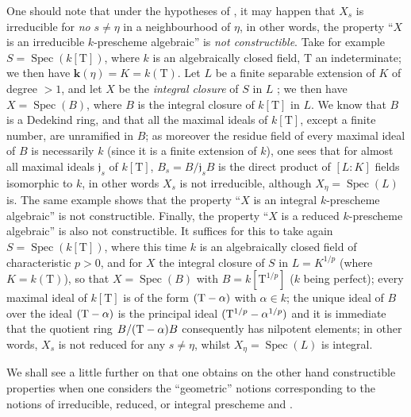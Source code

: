 \begin{remark}[9.5.7]
\label{IV.9.5.7}
One should note that under the hypotheses of , it may happen that $X_s$ is irreducible for \emph{no} $s\neq\eta$ in a neighbourhood of $\eta$, in other words, the property ``$X$ is an irreducible $k$-prescheme algebraic'' is \emph{not constructible}.
Take for example $S=\operatorname{Spec}(k[\mathrm{T}])$, where $k$ is an algebraically closed field, $\mathrm{T}$ an indeterminate; we then have $\boldsymbol{k}(\eta)=K=k(\mathrm{T})$.
Let $L$ be a finite separable extension of $K$ of degree $>1$, and let $X$ be the \emph{integral closure} of $S$ in $L$ ; we then have $X=\operatorname{Spec}(B)$, where $B$ is the integral closure of $k[\mathrm{T}]$ in $L$.
We know that $B$ is a Dedekind ring, and that all the maximal ideals of $k[\mathrm{T}]$, except a finite number, are unramified in $B$; as moreover the residue field of every maximal ideal of $B$ is necessarily $k$ (since it is a finite extension of $k$), one sees that for almost all maximal ideals $\mathfrak{j}_s$ of $k[\mathrm{T}]$, $B_s=B/\mathfrak{j}_s B$ is the direct product of $[L:K]$ fields isomorphic to $k$, in other words $X_s$ is not irreducible, although $X_\eta=\operatorname{Spec}(L)$ is.
The same example shows that the property ``$X$ is an integral $k$-prescheme algebraic'' is not constructible.
Finally, the property ``$X$ is a reduced $k$-prescheme algebraic'' is also not constructible.
It suffices for this to take again $S=\operatorname{Spec}(k[\mathrm{T}])$, where this time $k$ is an algebraically closed field of characteristic $p>0$, and for $X$ the integral closure of $S$ in $L=K^{1/p}$ (where $K=k(\mathrm{T})$), so that $X=\operatorname{Spec}(B)$ with $B=k[\mathrm{T}^{1/p}]$ ($k$ being perfect); every maximal ideal of $k[\mathrm{T}]$ is of the form $(\mathrm{T}-\alpha)$ with $\alpha\in k$; the unique ideal of $B$ over the ideal $(\mathrm{T}-\alpha)$ is the principal ideal $(\mathrm{T}^{1/p}-\alpha^{1/p})$ and it is immediate
that the quotient ring $B/(\mathrm{T}-\alpha)B$ consequently has nilpotent elements; in other words, $X_s$ is not reduced for any $s\neq\eta$, whilst $X_\eta=\operatorname{Spec}(L)$ is integral.

We shall see a little further on  that one obtains on the other hand constructible properties when one considers the ``geometric'' notions corresponding to the notions of irreducible, reduced, or integral prescheme  and .
\end{remark}

